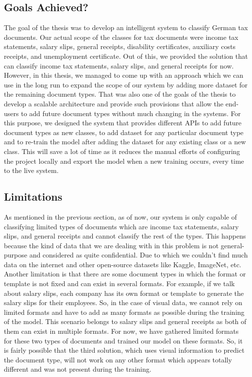 \subsection{Goals Achieved?}
The goal of the thesis was to develop an intelligent system to classify German tax documents. Our actual scope of the classes for tax documents were income tax statements, salary slips, general receipts, disability certificates, auxiliary costs receipts, and unemployment certificate. Out of this, we provided the solution that can classify income tax statements, salary slips, and general receipts for now. However, in this thesis, we managed to come up with an approach which we can use in the long run to expand the scope of our system by adding more dataset for the remaining document types. That was also one of the goals of the thesis to develop a scalable architecture and provide such provisions that allow the end-users to add future document types without much changing in the systems. For this purpose, we designed the system that provides different APIs to add future document types as new classes, to add dataset for any particular document type and to re-train the model after adding the dataset for any existing class or a new class. This will save a lot of time as it reduces the manual efforts of configuring the project locally and export the model when a new training occurs, every time to the live system.
\subsection{Limitations}
As mentioned in the previous section, as of now, our system is only capable of classifying limited types of documents which are income tax statements, salary slips, and general receipts and cannot classify the rest of the types. This happens because the kind of data that we are dealing with in this problem is not general-purpose and considered as quite confidential. Due to which we couldn't find much data on the internet and other open-source datasets like Kaggle, ImageNet, etc. Another limitation is that there are some document types in which the format or template is not fixed and can exist in several formats. For example, if we talk about salary slips, each company has its own format or template to generate the salary slips for their employees. So, in the case of visual data, we cannot rely on limited formats and have to add as many formats as possible during the training of the model. This scenario belongs to salary slips and general receipts as both of them can exist in multiple formats. For now, we have gathered limited formats for these two types of documents and trained our model on these formats. So, it is fairly possible that the third solution, which uses visual information to predict the document type, will not work on any other format which appears totally different and was not present during the training.
